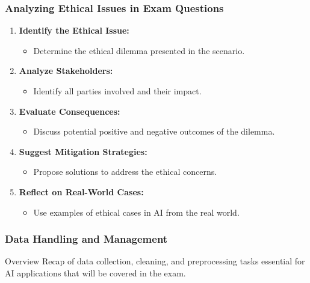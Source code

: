 \documentclass[aspectratio=169]{beamer}
\begin{document}
\begin{frame}[fragile]
    \frametitle{Analyzing Ethical Issues in Exam Questions}
    \begin{enumerate}
        \item \textbf{Identify the Ethical Issue:} 
            \begin{itemize}
                \item Determine the ethical dilemma presented in the scenario.
            \end{itemize}
        
        \item \textbf{Analyze Stakeholders:} 
            \begin{itemize}
                \item Identify all parties involved and their impact.
            \end{itemize}
        
        \item \textbf{Evaluate Consequences:}
            \begin{itemize}
                \item Discuss potential positive and negative outcomes of the dilemma.
            \end{itemize}
        
        \item \textbf{Suggest Mitigation Strategies:}
            \begin{itemize}
                \item Propose solutions to address the ethical concerns.
            \end{itemize}
        
        \item \textbf{Reflect on Real-World Cases:}
            \begin{itemize}
                \item Use examples of ethical cases in AI from the real world.
            \end{itemize}
    \end{enumerate}
\end{frame}

\begin{frame}
    \frametitle{Data Handling and Management}
    \begin{block}{Overview}
        Recap of data collection, cleaning, and preprocessing tasks essential for AI applications that will be covered in the exam.
    \end{block}
\end{frame}
\end{document}
